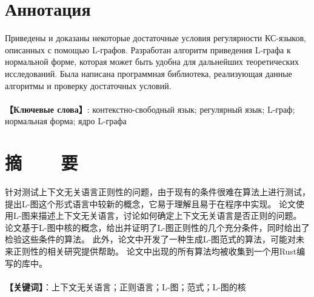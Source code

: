 \chapter*{Аннотация}

Приведены и доказаны некоторые достаточные условия регулярности КС-языков, описанных с помощью L-графов.
Разработан алгоритм приведения L-графа к нормальной форме, которая может быть удобна для дальнейших
теоретических исследований. 
Была написана программная библиотека, реализующая данные алгоритмы и проверку достаточных условий.
~ \\
~ \\
\textbf{【Ключевые слова】}: контекстно-свободный язык; регулярный язык; L-граф; нормальная форма; ядро L-графа
~ \\

\chapter*{摘~~~~要}

针对测试上下文无关语言正则性的问题，由于现有的条件很难在算法上进行测试，提出L-图这个形式语言中较新的概念，它易于理解且易于在程序中实现。
论文使用L-图来描述上下文无关语言，讨论如何确定上下文无关语言是否正则的问题。
论文基于L-图中核的概念，给出并证明了L-图正则性的几个充分条件，同时给出了检验这些条件的算法。
此外，论文中开发了一种生成L-图范式的算法，可能对未来正则性的相关研究提供帮助。
论文中出现的所有算法均被收集到一个用Rust编写的库中。
~ \\
~ \\
\textbf{【关键词】}：上下文无关语言；正则语言；L-图；范式；L-图的核

\pagebreak